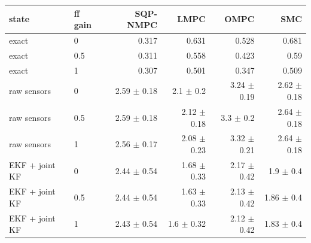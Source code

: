 \begin{tabular}{llrrrr}
\toprule
state & ff gain & SQP-NMPC & LMPC & OMPC & SMC \\
\midrule
exact & 0 & 0.317 & 0.631 & 0.528 & 0.681 \\
exact & 0.5 & 0.311 & 0.558 & 0.423 & 0.59 \\
exact & 1 & 0.307 & 0.501 & 0.347 & 0.509 \\
\addlinespace
raw sensors & 0 & 2.59 $\pm$ 0.18 & 2.1 $\pm$ 0.2 & 3.24 $\pm$ 0.19 & 2.62 $\pm$ 0.18 \\
raw sensors & 0.5 & 2.59 $\pm$ 0.18 & 2.12 $\pm$ 0.18 & 3.3 $\pm$ 0.2 & 2.64 $\pm$ 0.18 \\
raw sensors & 1 & 2.56 $\pm$ 0.17 & 2.08 $\pm$ 0.23 & 3.32 $\pm$ 0.21 & 2.64 $\pm$ 0.18 \\
\addlinespace
EKF + joint KF & 0 & 2.44 $\pm$ 0.54 & 1.68 $\pm$ 0.33 & 2.17 $\pm$ 0.42 & 1.9 $\pm$ 0.4 \\
EKF + joint KF & 0.5 & 2.44 $\pm$ 0.54 & 1.63 $\pm$ 0.33 & 2.13 $\pm$ 0.42 & 1.86 $\pm$ 0.4 \\
EKF + joint KF & 1 & 2.43 $\pm$ 0.54 & 1.6 $\pm$ 0.32 & 2.12 $\pm$ 0.42 & 1.83 $\pm$ 0.4 \\
\bottomrule
\end{tabular}
